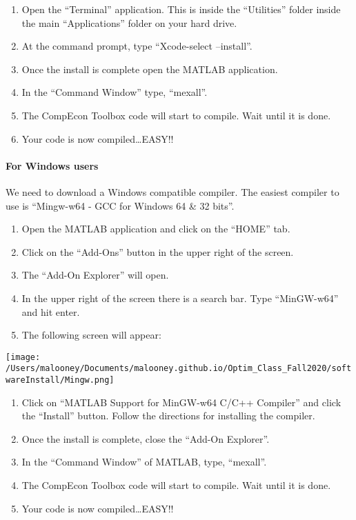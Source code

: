 \documentclass[
]{article}
\begin{document}
\begin{enumerate}
\def\labelenumi{\arabic{enumi}.}
\item
  Open the ``Terminal'' application. This is inside the ``Utilities''
  folder inside the main ``Applications'' folder on your hard drive.
\item
  At the command prompt, type ``Xcode-select --install''.
\item
  Once the install is complete open the MATLAB application.
\item
  In the ``Command Window'' type, ``mexall''.
\item
  The CompEcon Toolbox code will start to compile. Wait until it is
  done.
\item
  Your code is now compiled\ldots EASY!!
\end{enumerate}

\hypertarget{for-windows-users}{%
\paragraph{For Windows users}\label{for-windows-users}}

We need to download a Windows compatible compiler. The easiest compiler
to use is ``Mingw-w64 - GCC for Windows 64 \& 32 bits''.

\begin{enumerate}
\def\labelenumi{\arabic{enumi}.}
\item
  Open the MATLAB application and click on the ``HOME'' tab.
\item
  Click on the ``Add-Ons'' button in the upper right of the screen.
\item
  The ``Add-On Explorer'' will open.
\item
  In the upper right of the screen there is a search bar. Type
  ``MinGW-w64'' and hit enter.
\item
  The following screen will appear:
\end{enumerate}

\texttt{[image: /Users/malooney/Documents/malooney.github.io/Optim\_Class\_Fall2020/softwareInstall/Mingw.png]}

\begin{enumerate}
\def\labelenumi{\arabic{enumi}.}
\setcounter{enumi}{5}
\item
  Click on ``MATLAB Support for MinGW-w64 C/C++ Compiler'' and click the
  ``Install'' button. Follow the directions for installing the compiler.
\item
  Once the install is complete, close the ``Add-On Explorer''.
\item
  In the ``Command Window'' of MATLAB, type, ``mexall''.
\item
  The CompEcon Toolbox code will start to compile. Wait until it is
  done.
\item
  Your code is now compiled\ldots EASY!!
\end{enumerate}
\end{document}
